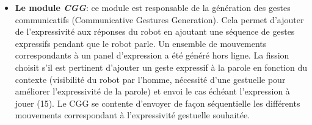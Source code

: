 \documentclass[a4paper,11pt,twoside]{StyleThese}
\begin{document}
\begin{itemize}
\item \textbf{Le module \textit{CGG}}: ce module est responsable de la génération des gestes communicatifs (Communicative Gestures Generation). Cela permet d'ajouter de l'expressivité aux réponses du robot en ajoutant une séquence de gestes expressifs pendant que le robot parle. Un ensemble de mouvements correspondants à un panel d'expression a été généré hors ligne. La fission choisit s'il est pertinent d'ajouter un geste expressif à la parole en fonction du contexte (visibilité du robot par l'homme, nécessité d'une gestuelle pour améliorer l'expressivité de la parole) et envoi le cas échéant l'expression à jouer (15). Le CGG se contente d'envoyer de façon séquentielle les différents mouvements correspondant à l'expressivité gestuelle souhaitée.
\end{itemize}

\end{document}
